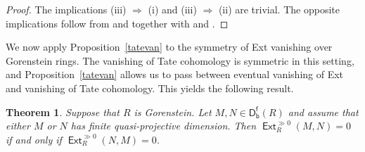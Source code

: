 \documentclass[10pt, a4paper,reqno]{amsart}
\newtheorem{thm}{Theorem}[section]
\theoremstyle{definition}
\theoremstyle{remark}
\numberwithin{equation}{thm}
\def\ZZ{\mathbb{Z}}
\def\cG{\mathcal{G}}
\def\Ext{\operatorname{\mathsf{Ext}}}
\def\Hom{\operatorname{\mathsf{Hom}}}
\def\Tor{\operatorname{\mathsf{Tor}}}
\def\D{\mathsf{D}}
\def\Dfb{\mathsf{D^f_b}}
\def\hinf{\operatorname{\mathsf{hinf}}}
\def\qpd{\operatorname{\mathsf{qpd}}}
\begin{document}
\begin{proof}
The implications (iii) $\Rightarrow$ (i) and (iii) $\Rightarrow$ (ii) are trivial.
The opposite implications follow from  and  together with  \cite[Theorem 4.5]{Vel} and \cite[Proposition 2.5 and Lemma 2.7]{CJ}.

\end{proof}


We now apply Proposition~\ref{tatevan} to the symmetry of Ext vanishing over Gorenstein rings. 
The vanishing of Tate cohomology is symmetric in this setting, and Proposition~\ref{tatevan} allows us to pass between eventual vanishing of Ext and vanishing of Tate cohomology. 
This yields the following result.

\begin{thm}\label{symm}
Suppose that $R$ is Gorenstein.
Let $M,N\in\Dfb(R)$ and assume that either $M$ or $N$ has finite quasi-projective dimension.
Then $\Ext_R^{\gg0}(M,N)=0$ if and only if $\Ext_R^{\gg0}(N,M)=0$.
\end{thm}
\end{document}
